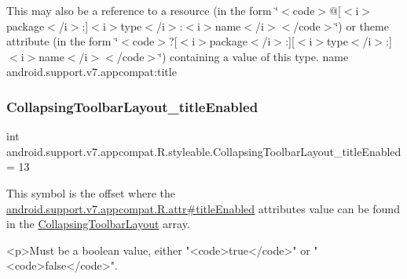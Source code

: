This may also be a reference to a resource (in the form \char`\"{}$<$code$>$@\mbox{[}$<$i$>$package$<$/i$>$\+:\mbox{]}$<$i$>$type$<$/i$>$\+:$<$i$>$name$<$/i$>$$<$/code$>$\char`\"{}) or theme attribute (in the form \char`\"{}$<$code$>$?\mbox{[}$<$i$>$package$<$/i$>$\+:\mbox{]}\mbox{[}$<$i$>$type$<$/i$>$\+:\mbox{]}$<$i$>$name$<$/i$>$$<$/code$>$\char`\"{}) containing a value of this type.  name android.\+support.\+v7.\+appcompat\+:title \mbox{\label{classandroid_1_1support_1_1v7_1_1appcompat_1_1R_1_1styleable_a9dbf91222ca3cd313d450c7f1c17db70}} 
\subsubsection{\texorpdfstring{Collapsing\+Toolbar\+Layout\+\_\+title\+Enabled}{CollapsingToolbarLayout\_titleEnabled}}
{\footnotesize\ttfamily int android.\+support.\+v7.\+appcompat.\+R.\+styleable.\+Collapsing\+Toolbar\+Layout\+\_\+title\+Enabled = 13\hspace{0.3cm}{\ttfamily [static]}}

This symbol is the offset where the \hyperlink{classandroid_1_1support_1_1v7_1_1appcompat_1_1R_1_1attr_ae7b9611359d9bc4c48118853cd058182}{android.\+support.\+v7.\+appcompat.\+R.\+attr\#title\+Enabled} attribute\textquotesingle{}s value can be found in the \hyperlink{classandroid_1_1support_1_1v7_1_1appcompat_1_1R_1_1styleable_a8d282d917f35e5a08dd37db243410383}{Collapsing\+Toolbar\+Layout} array.

\begin{DoxyVerb}      <p>Must be a boolean value, either "<code>true</code>" or "<code>false</code>".
\end{DoxyVerb}
 

